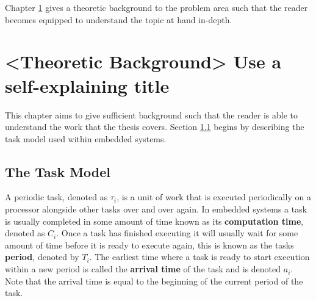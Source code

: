 \documentclass{kththesis}
\begin{document}
Chapter \ref{ch:theoretic_background} gives a theoretic background to the problem area such that the
reader becomes equipped to understand the topic at hand in-depth.


\chapter{<Theoretic Background> Use a self-explaining title}\label{ch:theoretic_background}

This chapter aims to give sufficient background such that the reader is able to understand the work
that the thesis covers. Section \ref{sec:the_task_model} begins by describing the task model used
within embedded systems.


\section{The Task Model} \label{sec:the_task_model}

A periodic task, denoted as $\tau_i$, is a unit of work that is executed periodically on a processor
alongside other tasks over and over again. In embedded systems a task is usually completed in some
amount of time known as its \textbf{computation time}, denoted as $C_i$. Once a task has finished
executing it will usually wait for some amount of time before it is ready to execute again, this is
known as the tasks \textbf{period}, denoted by $T_i$. The earliest time where a task is ready to
start execution within a new period is called the \textbf{arrival time} of the task and is denoted $
a_i $. Note that the arrival time is equal to the beginning of the current period of the task.
\end{document}

